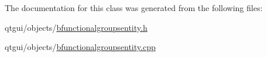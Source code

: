 The documentation for this class was generated from the following files\+:\begin{DoxyCompactItemize}
\item 
qtgui/objects/\mbox{\hyperlink{bfunctionalgroupsentity_8h}{bfunctionalgroupsentity.\+h}}\item 
qtgui/objects/\mbox{\hyperlink{bfunctionalgroupsentity_8cpp}{bfunctionalgroupsentity.\+cpp}}\end{DoxyCompactItemize}

